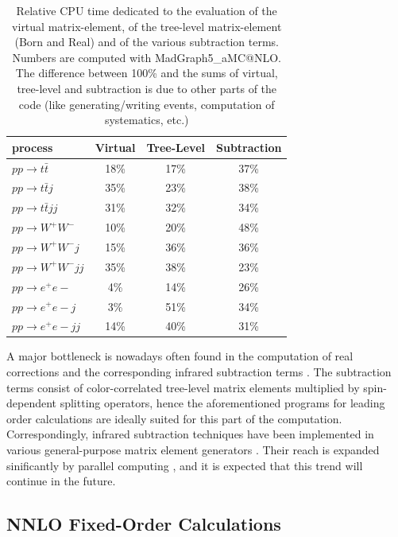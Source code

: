 \documentclass{article}
\begin{document}
\begin{table}
  \begin{center}
    \begin{tabular}{lccc}
\hline
process & Virtual & Tree-Level & Subtraction \\
\hline\hline
$p p \to t \bar t$ & 18\% & 17\% & 37\% \\
$p p \to t  \bar t j$ & 35\% & 23\% & 38\% \\
$p p \to t  \bar t j j $ & 31\% & 32\% & 34\% \\
\hline
$p p \to W^+ W^- $ & 10\% & 20\% & 48\% \\
$p p \to W^+ W^- j$ & 15\% & 36\% & 36\% \\
$p p \to W^+ W^- j j$ & 35\% & 38\% & 23\% \\
\hline
$p p \to e^+ e- $ & 4\% & 14\% &  26\% \\
$p p \to e^+ e- j $ & 3\% & 51\% & 34\% \\
$p p \to e^+ e- j j$ & 14\% & 40\% & 31\% \\

\hline
    \end{tabular}
    \caption{\label{table:MG5NLO} Relative CPU time dedicated to the evaluation of the virtual matrix-element, of the tree-level matrix-element (Born and Real) and of the various subtraction terms. Numbers are computed with {\sc MadGraph5\_aMC@NLO}. The difference between 100\% and the sums of virtual, tree-level and subtraction is due to other parts of the code (like generating/writing events, computation of systematics, etc.)}
   \end{center}
\end{table} 

A major bottleneck is nowadays often found in the computation of 
real corrections and the corresponding infrared subtraction terms
\cite{Catani:1996vz,Catani:2002hc}.
The subtraction terms consist of color-correlated tree-level 
matrix elements multiplied by spin-dependent splitting operators, 
hence the aforementioned programs for leading order calculations 
are ideally suited for this part of the computation. Correspondingly,
infrared subtraction techniques have been implemented in various
general-purpose matrix element generators \cite{Gleisberg:2007md,
  Czakon:2009ss,Frederix:2008hu,Frederix:2010cj,Frederix:2009yq}.
Their reach is expanded sinificantly by parallel computing \cite{Hoche:2013zja,Bern:2013gka,Hoche:2016elu}, and it is expected
that this trend will continue in the future.


\subsection{NNLO Fixed-Order Calculations}
\end{document}
